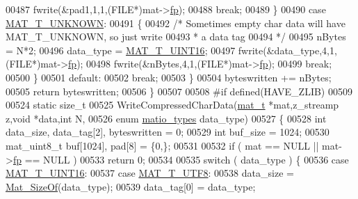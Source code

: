 \begin{DoxyCode}
{{{{00487                     fwrite(&pad1,1,1,(FILE*)mat->\hyperlink{struct__mat__t_a85f562e407ca9ad4d2a6e14f839432b7}{fp});
00488             \textcolor{keywordflow}{break};
00489         \}
00490         \textcolor{keywordflow}{case} \hyperlink{group___m_a_t_ggacf7b3b879282b7ab3a51190e49bf3453a2a7318fe8bf9464935e7ed8902618293}{MAT\_T\_UNKNOWN}:
00491         \{
00492             \textcolor{comment}{/* Sometimes empty char data will have MAT\_T\_UNKNOWN, so just write}
00493 \textcolor{comment}{             * a data tag}
00494 \textcolor{comment}{             */}
00495             nBytes = N*2;
00496             data\_type = \hyperlink{group___m_a_t_ggacf7b3b879282b7ab3a51190e49bf3453a05bc7af7680aa68be95126ae0a4c2e31}{MAT\_T\_UINT16};
00497             fwrite(&data\_type,4,1,(FILE*)mat->\hyperlink{struct__mat__t_a85f562e407ca9ad4d2a6e14f839432b7}{fp});
00498             fwrite(&nBytes,4,1,(FILE*)mat->\hyperlink{struct__mat__t_a85f562e407ca9ad4d2a6e14f839432b7}{fp});
00499             \textcolor{keywordflow}{break};
00500         \}
00501         \textcolor{keywordflow}{default}:
00502             \textcolor{keywordflow}{break};
00503     \}
00504     byteswritten += nBytes;
00505     \textcolor{keywordflow}{return} byteswritten;
00506 \}
00507 
00508 \textcolor{preprocessor}{#if defined(HAVE\_ZLIB)}
00509 
00524 \textcolor{keyword}{static} \textcolor{keywordtype}{size\_t}
00525 WriteCompressedCharData(\hyperlink{struct__mat__t}{mat\_t} *mat,z\_streamp z,\textcolor{keywordtype}{void} *data,\textcolor{keywordtype}{int} N,
00526     \textcolor{keyword}{enum} \hyperlink{group___m_a_t_gacf7b3b879282b7ab3a51190e49bf3453}{matio\_types} data\_type)
00527 \{
00528     \textcolor{keywordtype}{int} data\_size, data\_tag[2], byteswritten = 0;
00529     \textcolor{keywordtype}{int} buf\_size = 1024;
00530     mat\_uint8\_t   buf[1024], pad[8] = \{0,\};
00531 
00532     \textcolor{keywordflow}{if} ( mat == NULL || mat->\hyperlink{struct__mat__t_a85f562e407ca9ad4d2a6e14f839432b7}{fp} == NULL )
00533         \textcolor{keywordflow}{return} 0;
00534 
00535     \textcolor{keywordflow}{switch} ( data\_type ) \{
00536         \textcolor{keywordflow}{case} \hyperlink{group___m_a_t_ggacf7b3b879282b7ab3a51190e49bf3453a05bc7af7680aa68be95126ae0a4c2e31}{MAT\_T\_UINT16}:
00537         \textcolor{keywordflow}{case} \hyperlink{group___m_a_t_ggacf7b3b879282b7ab3a51190e49bf3453ac34ad81f5cbd3b7d0d95e57e5be0149b}{MAT\_T\_UTF8}:
00538             data\_size = \hyperlink{group__mat__util_gab6774aabdc124c540c1e7686d0804940}{Mat\_SizeOf}(data\_type);
00539             data\_tag[0] = data\_type;
}}}}
\end{DoxyCode}
